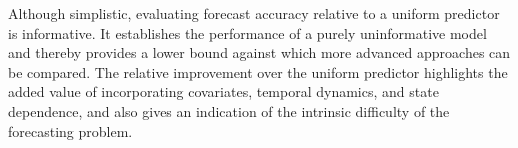 Although simplistic, evaluating forecast accuracy relative to a uniform predictor is informative. It establishes the performance of a purely uninformative model and thereby provides a lower bound against which more advanced approaches can be compared. The relative improvement over the uniform predictor highlights the added value of incorporating covariates, temporal dynamics, and state dependence, and also gives an indication of the intrinsic difficulty of the forecasting problem.




